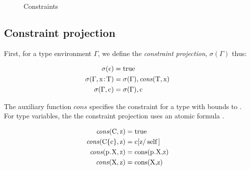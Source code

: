 \documentclass[preprint,nocopyrightspace,9pt]{sigplanconf}
\begin{document}
\begin{figure}




\caption{Constraints}
\label{fig:subtyping}
\label{fig:constraints}
\end{figure}



\subsection{
Constraint projection
}

First, for a type environment $\Gamma$,
we define the \emph{constraint projection},
$\sigma(\Gamma)$ thus:

\begin{align*}
\sigma(\epsilon) &= \Xcd{true} \\
\sigma(\Gamma, \Xcd{x} \ty \Xcd{T}) &=
        \sigma(\Gamma),
        \cons{\Xcd{T}}{\Xcd{x}}
\\
\sigma(\Gamma, \Xcd{c}) &= \sigma(\Gamma), \Xcd{c} \\
\end{align*}

The
auxiliary function $\mathit{cons}$
specifies the constraint for a type  with 
bounds to .
For type variables, the
the constraint projection uses an atomic formula .

\begin{align*}
\cons{\Xcd{C}}{\Xcd{z}} &= \Xcd{true} \\
\cons{\Xcd{C\{c\}}}{\Xcd{z}} &= \Xcd{c}[\Xcd{z}/\Xcd{self}] \\
\cons{\Xcd{p.X}}{\Xcd{z}} &= \Xcd{cons(p.X,z)} \\
\cons{\Xcd{X}}{\Xcd{z}} &= \Xcd{cons(X,z)} \\
\end{align*}
\end{document}

